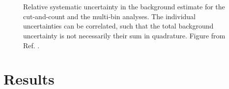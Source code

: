 \begin{figure}[htbp]
	\centering
	\\
	\\
	\caption{Relative systematic uncertainty in the background estimate for  the cut-and-count and  the multi-bin analyses. The individual uncertainties can be correlated, such that the total background uncertainty is not necessarily their sum in quadrature.  Figure from Ref. \cite{Aaboud:2017hrg}.
	} 
	\label{fig:syst}
\end{figure}

\section{Results}
\label{sec:strongprod:results}

